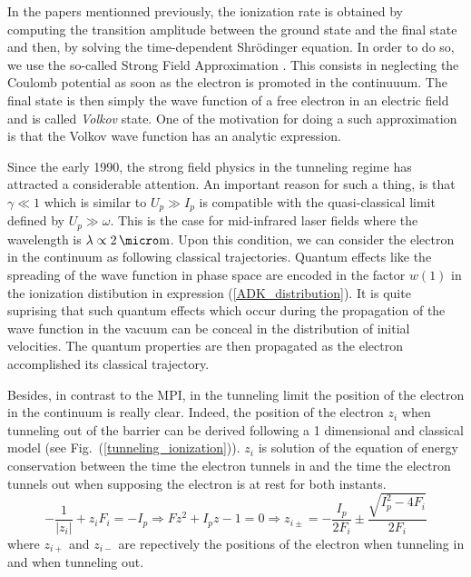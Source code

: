 \documentclass[a4paper]{article}
\begin{document}
In the papers mentionned previously, the ionization rate is obtained by computing the transition amplitude between the ground state and the final state and then, by solving the time-dependent Shr\"odinger equation. In order to do so, we use the so-called Strong Field Approximation \cite{Misha_2014}. This consists in neglecting the Coulomb potential as soon as the electron is promoted in the continuuum. The final state is then simply the wave function of a free electron in an electric field and is called \textit{Volkov} state. One of the motivation for doing a such approximation is that the Volkov wave function has an analytic expression.
\par
Since the early 1990, the strong field physics in the tunneling regime has attracted a considerable attention. An important reason for such a thing, is that $\gamma \ll 1$ which is similar to $U_{p} \gg I_{p}$ is compatible with the quasi-classical limit defined by $U_{p} \gg \omega$. This is the case for mid-infrared laser fields where the wavelength is $\lambda \propto 2\,\micro\text{m}$. Upon this condition, we can consider the electron in the continuum as following classical trajectories. Quantum effects like the spreading of the wave function in phase space are encoded in the factor $w(1)$ in the ionization distibution in expression (\ref{ADK_distribution}). It is quite suprising that such quantum effects which occur during the propagation of the wave function in the vacuum can be conceal in the distribution of initial velocities. The quantum properties are then propagated as the electron accomplished its classical trajectory. 
\par
Besides, in contrast to the MPI, in the tunneling limit the position of the electron in the continuum is really clear.
Indeed, the position of the electron $z_{i}$ when tunneling out of the barrier can be derived following a 1 dimensional and classical model (see Fig.~(\ref{tunneling_ionization})). $z_{i}$ is solution of the equation of energy conservation between the time the electron tunnels in and the time the electron tunnels out when supposing the electron is at rest for both instants.
\begin{equation}
-\frac{1}{| z_{i} |}+z_{i}F_{i}=-I_{p} \Rightarrow Fz^{2}+I_{p}z-1=0 \Rightarrow z_{i\pm}=-\frac{I_{p}}{2F_{i}}\pm\frac{\sqrt{I_{p}^{2}-4F_{i}}}{2F_{i}}
\end{equation} 
where $z_{i+}$ and $z_{i-}$ are repectively the positions of the electron when tunneling in and when tunneling out.
\end{document}
